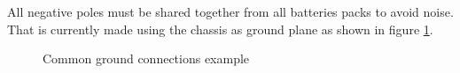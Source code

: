 All negative poles must be shared together from all batteries packs to avoid noise. That is currently made using the chassis as ground plane as shown in figure \ref{fig:common_ground}.

\begin{figure}[]
	\centering
	\caption{Common ground connections example}
	\label{fig:common_ground}
\end{figure}

